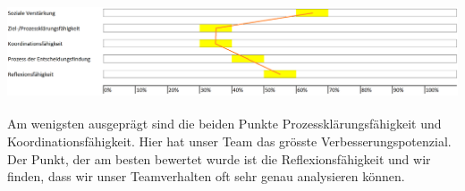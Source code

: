 \includegraphics[height=2.8cm]{images/Gruppeneinsch.png}

Am wenigsten ausgeprägt sind die beiden Punkte Prozessklärungsfähigkeit und Koordinationsfähigkeit. Hier hat unser Team das grösste Verbesserungspotenzial. Der Punkt, der am besten bewertet wurde ist die Reflexionsfähigkeit und wir finden, dass wir unser Teamverhalten oft sehr genau analysieren können. 

